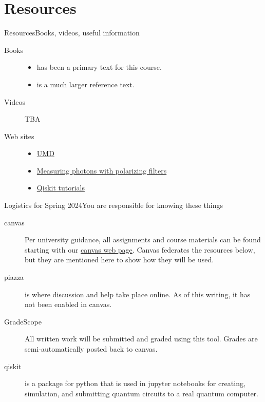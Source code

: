 \section*{Resources}
\begin{frame}{Resources}{Books, videos, useful information}
\begin{description}
    \item[Books]
    \begin{itemize}
        \item \Kaye{} has been a primary text for this course.
        \item \MikeIke{} is a much larger reference text.
    \end{itemize}
    \item[Videos] TBA
    \item[Web sites]
    \begin{itemize}
        \item \href{https://quantumatlas.umd.edu/}{UMD}
        \item \href{https://quantumatlas.umd.edu/gallery/MeasuringPolarization}{Measuring photons with polarizing filters}
        \item \href{https://github.com/Qiskit/qiskit-tutorials/tree/master/tutorials}{Qiskit tutorials}
    \end{itemize}
    
\end{description}
\end{frame}

\begin{frame}{Logistics for Spring 2024}{You are responsible for knowing these things}

\begin{description}
    \item[canvas]  Per university guidance, all assignments and course materials can be found starting with our \href{https://wustl.instructure.com/courses/101458}{canvas web page}.  Canvas federates the resources below, but they are mentioned here to show how they will be used.
    \item[piazza] is where discussion and help take place online.  As of this writing, it has not been enabled in canvas.
    \item[GradeScope] All written work will be submitted and graded using this tool.  Grades are semi-automatically posted back to canvas.
    \item[qiskit] is a package for python that is used in jupyter notebooks for creating, simulation, and submitting quantum circuits to a real quantum computer.
\end{description}
\end{frame}

